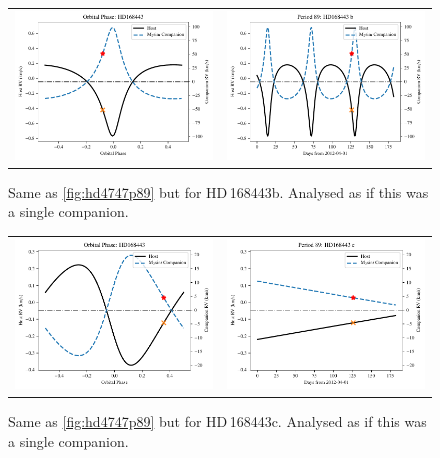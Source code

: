 \begin{figure}
    \centering
    \begin{tabular}{cc}
        \includegraphics[width=0.45\linewidth]{figures/direct-recovery/orbital-plots/HD168443b_orbital_phase.pdf} &
        \includegraphics[width=0.45\linewidth]{figures/direct-recovery/orbital-plots/HD168443b_p89.pdf}\\
    \end{tabular}
    \caption[]{Same as \cref{fig:hd4747p89} but for {HD\,168443}b.
        Analysed as if this was a single companion.}
    \label{fig:hd168443bp89}
\end{figure}

\begin{figure}
    \centering
    \begin{tabular}{cc}
        \includegraphics[width=0.45\linewidth]{figures/direct-recovery/orbital-plots/HD168443c_orbital_phase.pdf} &
        \includegraphics[width=0.45\linewidth]{figures/direct-recovery/orbital-plots/HD168443c_p89.pdf}\\
    \end{tabular}
    \caption[]{Same as \cref{fig:hd4747p89} but for {HD\,168443}c.
        Analysed as if this was a single companion.}
    \label{fig:hd168443cp89}
\end{figure}

